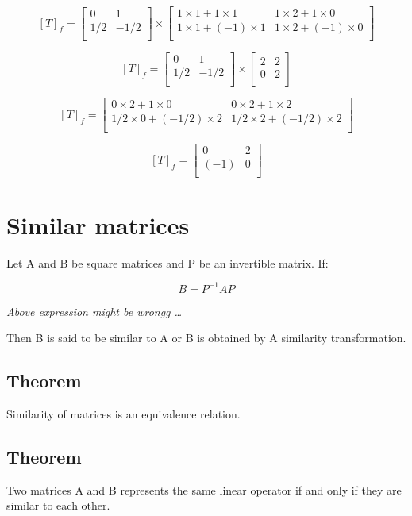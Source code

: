 \documentclass{book}
\begin{document}
\[{[T]}_f = \begin{bmatrix}
	0 & 1 \\
	1/2 & -1/2 \\
\end{bmatrix}
\times
\begin{bmatrix}
	1 \times 1 + 1 \times 1 & 1 \times 2 + 1 \times 0 \\
	1 \times 1 + (-1) \times 1 & 1 \times 2 + (-1) \times 0 \\
\end{bmatrix}\]

\[{[T]}_f = \begin{bmatrix}
	0 & 1 \\
	1/2 & -1/2 \\
\end{bmatrix}
\times
\begin{bmatrix}
	2 & 2 \\
	0 & 2 \\
\end{bmatrix}\]

\[{[T]}_f = \begin{bmatrix}
	0 \times 2 + 1 \times 0 & 0 \times 2 + 1 \times 2 \\
	1/2 \times 0 + (-1/2) \times 2 & 1/2 \times 2 + (-1/2) \times 2 \\
\end{bmatrix}\]

\[{[T]}_f = \begin{bmatrix}
	0 & 2 \\
	(-1) & 0 \\
\end{bmatrix}\]

\section{Similar matrices}

Let A and B be square matrices and P be an invertible matrix. If:

\[B = P^{-1}AP\]

\itshape{Above expression might be wrongg \ldots}

Then B is said to be similar to A or B is obtained by A similarity transformation.

\subsection{Theorem}
Similarity of matrices is an equivalence relation.

\subsection{Theorem}
Two matrices A and B represents the same linear operator if and only if they are similar to each other.
\end{document}
